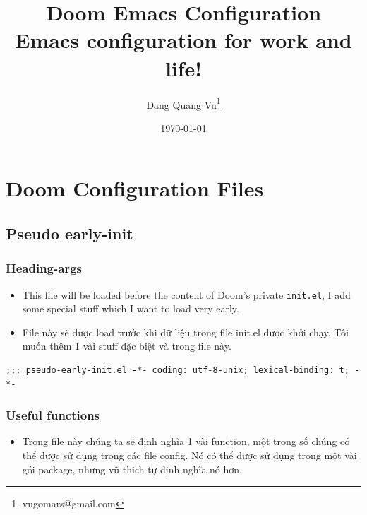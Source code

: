 \documentclass[11pt]{article}
\author{Dang Quang Vu\thanks{vugomars@gmail.com}}
\date{\today}
\title{Doom Emacs Configuration\\\medskip
\large Emacs configuration for work and life!}
\begin{document}
\maketitle
\tableofcontents


\section{Doom Configuration Files}
\label{sec:org2e65108}
\subsection{Pseudo early-init}
\label{sec:orgdbad092}
\subsubsection{Heading-args}
\label{sec:org35b11c1}
\begin{itemize}
\item This file will be loaded before the content of Doom's private \texttt{init.el}, I add some special stuff which I want to load very early.
\item File này sẽ được load trước khi dữ liệu trong file init.el được khởi chạy, Tôi muốn thêm 1 vài stuff đặc biệt và trong file này.
\end{itemize}

\begin{verbatim}
;;; pseudo-early-init.el -*- coding: utf-8-unix; lexical-binding: t; -*-

\end{verbatim}

\subsubsection{Useful functions}
\label{sec:org3cc9ee5}
\begin{itemize}
\item Trong file này chúng ta sẽ định nghĩa 1 vài function, một trong số chúng có thể dược sử dụng trong các file config. Nó có thể được sử dụng trong một vài gói package, nhưng vũ thich tự định nghĩa nó hơn.
\end{itemize}
\end{document}
